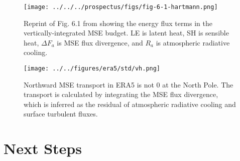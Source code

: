 \documentclass[11pt]{article}
\begin{document}
\begin{figure}[htbp]
\centering
\texttt{[image: ../../../prospectus/figs/fig-6-1-hartmann.png]}
\caption{\label{fig:org2dc7b99}Reprint of Fig. 6.1 from \cite{hartmann_global_2016} showing the energy flux terms in the vertically-integrated MSE budget. LE is latent heat, SH is sensible heat, \(\Delta F_a\) is MSE flux divergence, and \(R_a\) is atmospheric radiative cooling.}
\end{figure}

\begin{figure}[htbp]
\centering
\texttt{[image: ../../figures/era5/std/vh.png]}
\caption{\label{fig:org16f4d65}Northward MSE transport in ERA5 is not 0 at the North Pole. The transport is calculated by integrating the MSE flux divergence, which is inferred as the residual of atmospheric radiative cooling and surface turbulent fluxes.}
\end{figure}


\section{Next Steps}
\label{sec:org41380c3}



\end{document}
